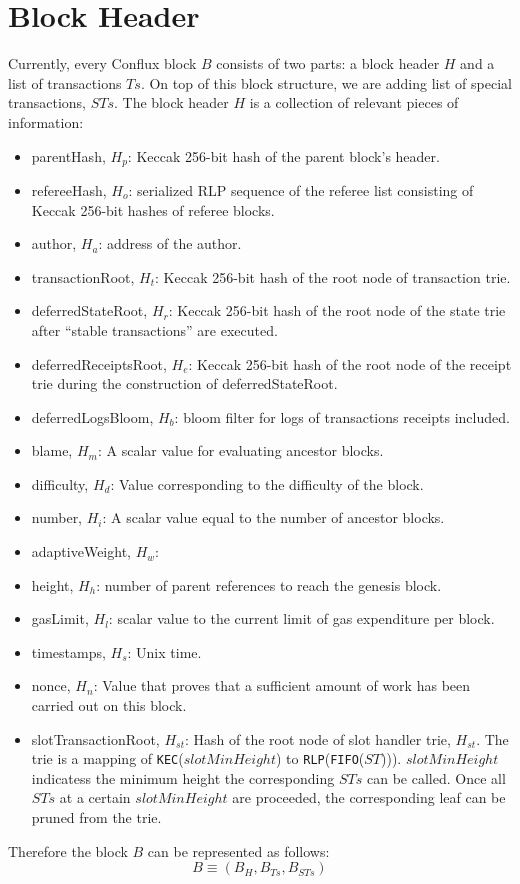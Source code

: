 \documentclass{article}
\begin{document}
\newpage
\section{Block Header}
Currently, every Conflux block $B$ consists of two parts: a block header $H$ and a list of transactions $Ts$. On top of this block structure, we are adding list of special transactions, $STs$. The block header $H$ is a collection of relevant pieces of information:
\begin{itemize}
    \item parentHash, $H_p$: Keccak 256-bit hash of the parent block’s header.
    \item refereeHash, $H_o$: serialized RLP sequence of the referee list consisting of Keccak 256-bit hashes of referee blocks.
    \item author, $H_a$: address of the author.
    \item transactionRoot, $H_t$: Keccak 256-bit hash of the root node of transaction trie.
    \item deferredStateRoot, $H_r$: Keccak 256-bit hash of the root node of the state trie after “stable transactions” are executed.
    \item deferredReceiptsRoot, $H_e$: Keccak 256-bit hash of the root node of the receipt trie during the construction of deferredStateRoot.
    \item deferredLogsBloom, $H_b$: bloom filter for logs of transactions receipts included.
    \item blame, $H_m$: A scalar value for evaluating ancestor blocks.
    \item difficulty, $H_d$: Value corresponding to the difficulty of the block.
    \item number, $H_i$: A scalar value equal to the number of ancestor blocks.
    \item adaptiveWeight, $H_w$:
    \item height, $H_h$: number of parent references to reach the genesis block.
    \item gasLimit, $H_l$: scalar value to the current limit of gas expenditure per block.
    \item timestamps, $H_s$: Unix time.
    \item nonce, $H_n$: Value that proves that a sufficient amount of work has been carried out on this block.
    \item slotTransactionRoot, $H_{st}$: Hash of the root node of slot handler trie, $H_{st}$. The trie is a mapping of \texttt{KEC}($slotMinHeight$) to \texttt{RLP}(\texttt{FIFO}($ST$))). $slotMinHeight$ indicatess the minimum height the corresponding $STs$ can be called. Once all $STs$ at a certain $slotMinHeight$ are proceeded, the corresponding leaf can be pruned from the trie.
\end{itemize}
Therefore the block $B$ can be represented as follows:
\begin{equation*}
    B \equiv (B_H, B_{Ts}, B_{STs})
\end{equation*}
\end{document}
